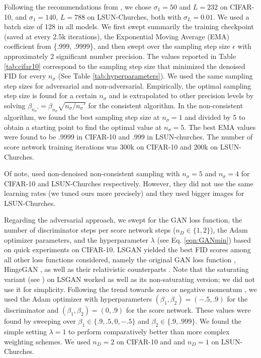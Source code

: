 \documentclass{article} \usepackage{iclr2021_conference_notitle,times}
\theoremstyle{definition}
\theoremstyle{definition}
\begin{document}
Following the recommendations from \citet{song2020improved}, we chose $\sigma_1=50$ and $L=232$ on CIFAR-10, and $\sigma_1=140$, $L=788$ on LSUN-Churches, both with $\sigma_L = 0.01$. We used a batch size of 128 in all models. We first swept summarily the training checkpoint (saved at every 2.5k iterations), the Exponential Moving Average (EMA) coefficient from \{.999, .9999\}, and then swept over the sampling step size $\epsilon$ with approximately 2 significant number precision. The values reported in Table \ref{tab:cifar10} correspond to the sampling step size that minimized the denoised FID for every $n_\sigma$ (See Table \ref{tab:hyperparameters}). We used the same sampling step sizes for adversarial and non-adversarial. Empirically, the optimal sampling step size is found for a certain $n_\sigma $ and is extrapolated to other precision levels by solving $\beta_{n_\sigma'} = \beta_{n_\sigma} \sqrt{n_\sigma/n_\sigma'}$ for the consistent algorithm. In the non-consistent algorithm, we found the best sampling step size at $n_\sigma = 1$ and divided by 5 to obtain a starting point to find the optimal value at $n_\sigma = 5$. The best EMA values were found to be .9999 in CIFAR-10 and .999 in LSUN-churches. The number of score network training iterations was 300k on CIFAR-10 and 200k on LSUN-Churches.

Of note, \citet{song2020improved} used non-denoised non-consistent sampling with $n_\sigma=5$ and $n_\sigma=4$ for CIFAR-10 and LSUN-Churches respectively. However, they did not use the same learning rates (we tuned ours more precisely) and they used bigger images for LSUN-Churches.

Regarding the adversarial approach, we swept for the GAN loss function, the number of discriminator steps per score network steps ($n_D \in \{1,2\}$), the Adam optimizer \citep{Adam} parameters, and the hyperparameter $\lambda$ (see Eq. \ref{eqn:GANmin}) based on quick experiments on CIFAR-10. LSGAN \citep{LSGAN} yielded the best FID scores among all other loss functions considered, namely the original GAN loss function \citep{GAN}, HingeGAN \citep{lim2017geometric}, as well as their relativistic counterparts \citep{jolicoeur2018relativistic,jolicoeur2019relativistic}. Note that the saturating variant (see \citet{GAN}) on LSGAN worked as well as its non-saturating version; we did not use it for simplicity. Following the trend towards zero or negative momentum \citep{gidel2019negative}, we used the Adam optimizer with hyperparameters $(\beta_1,\beta_2)=(-.5,.9)$ for the discriminator and $(\beta_1,\beta_2)=(0,.9)$ for the score network. These values were found by sweeping over $\beta_1 \in \{.9,.5,0,-.5\}$ and $\beta_2 \in \{.9, .999\}$. We found the simple setting $\lambda=1$ to perform comparatively better than more complex weighting schemes. We used $n_D=2$ on CIFAR-10 and and $n_D=1$ on LSUN-Churches.
\end{document}
